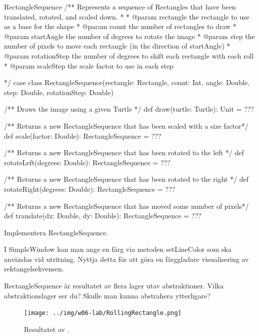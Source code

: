 \begin{ScalaSpec}{RectangleSequence}
/** Represents a sequence of Rectangles that have been translated,
    rotated, and scaled down.
  *
  * @param rectangle        the rectangle to use as a base for the shape
  * @param count            the number of rectangles to draw
  * @param startAngle       the number of degrees to rotate the image
  * @param step             the number of pixels to move each rectangle
                            (in the direction of startAngle)
  * @param rotationStep     the number of degrees to shift each rectangle
                            with each roll
  * @param scaleStep        the scale factor to use in each step
                          
  */
case class RectangleSequence(rectangle: Rectangle,
                             count: Int,
                             angle: Double,
                             step: Double,
                             rotationStep: Double) {

  /** Draws the image using a given Turtle */
  def draw(turtle: Turtle): Unit = ???

  /** Returns a new RectangleSequence that has been scaled with a size factor*/
  def scale(factor: Double): RectangleSequence = ???

  /** Returns a new RectangleSequence that has been rotated to the left */
  def rotateLeft(degrees: Double): RectangleSequence = ???

  /** Returns a new RectangleSequence that has been rotated to the right */
  def rotateRight(degrees: Double): RectangleSequence = ???

  /** Returns a new RectangleSequence that has moved some number of pixels*/
  def translate(dx: Double, dy: Double): RectangleSequence = ???
}
\end{ScalaSpec}

\Subtask Implementera RectangleSequence.

\Subtask I SimpleWindow kan man ange en färg via metoden setLineColor som ska användas vid utritning. Nyttja detta för att göra en färggladare visualisering av rektangelsekvensen.

\Subtask RectangleSequence är resultatet av flera lager utav abstraktioner. Vilka abstraktionslager ser du? Skulle man kunna abstrahera ytterligare?



\begin{figure}[H]
\centering
\texttt{[image: ../img/w06-lab/RollingRectangle.png]}
\caption {Resultatet av \newline {}.}
\label{fig:classes:turtlegraphics:rollingrectangle}
\end{figure}


